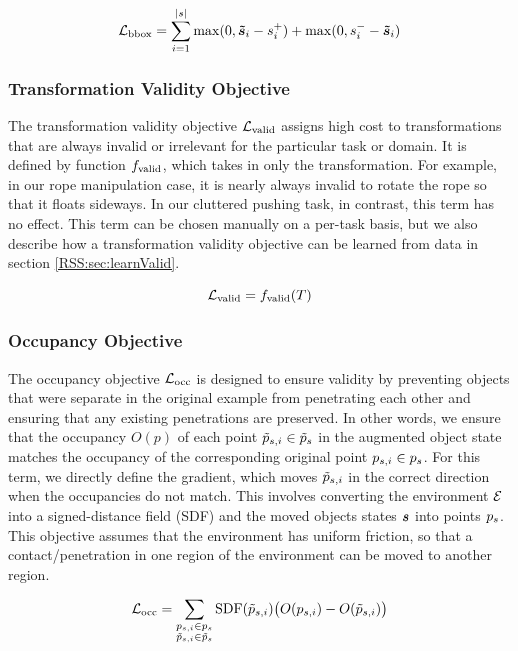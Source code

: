 \begin{equation}
\mathcal{L}_\text{bbox} = \sum_{i=1}^{|s|}{\max(0,\bm{\Tilde{s}}_i - s^+_i) + \max(0,s^-_i-\bm{\Tilde{s}}_i)}
\end{equation}

\subsubsection{Transformation Validity Objective}
The transformation validity objective $\mathcal{L}_\text{valid}$ assigns high cost to transformations that are always invalid or irrelevant for the particular task or domain. It is defined by function $f_\text{valid}$, which takes in only the transformation. For example, in our rope manipulation case, it is nearly always invalid to rotate the rope so that it floats sideways. In our cluttered pushing task, in contrast, this term has no effect. This term can be chosen manually on a per-task basis, but we also describe how a transformation validity objective can be learned from data in section \ref{RSS:sec:learnValid}.

\begin{equation}
\mathcal{L}_\text{valid} = f_\text{valid}(T)
\end{equation}

\subsubsection{Occupancy Objective}
The occupancy objective $\mathcal{L}_\text{occ}$ is designed to ensure validity by preventing objects that were separate in the original example from penetrating each other and ensuring that any existing penetrations are preserved. In other words, we ensure that the occupancy $O(p)$ of each point $\Tilde{p}_{s,i}\in\Tilde{p}_s$ in the augmented object state matches the occupancy of the corresponding original point $p_{s,i}\in p_s$. For this term, we directly define the gradient, which moves $\Tilde{p}_{s,i}$ in the correct direction when the occupancies do not match. This involves converting the environment $\mathcal{E}$ into a signed-distance field (SDF) and the moved objects states $\bm{s}$ into points $p_s$. This objective assumes that the environment has uniform friction, so that a contact/penetration in one region of the environment can be moved to another region.

\begin{equation}
\mathcal{L}_\text{occ}=\sum_{\substack{p_{s,i}\in p_s \\ \Tilde{p}_{s,i}\in\Tilde{p}_s}} \mathrm{SDF}(\Tilde{p}_{s,i})\big(O(p_{s,i})-O(\Tilde{p}_{s,i})\big)
\end{equation}

